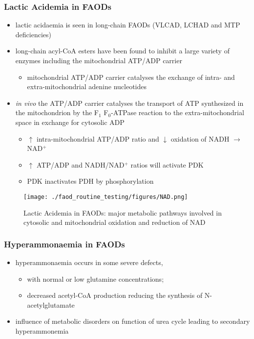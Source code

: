 \documentclass{scrartcl}
\begin{document}
\subsubsection{Lactic Acidemia in FAODs}
\label{sec:orga243ad2}
\begin{itemize}
\item lactic acidaemia is seen in long-chain FAODs (VLCAD, LCHAD and MTP deficiencies)
\item long-chain acyl-CoA esters have been found to inhibit a large
variety of enzymes including the mitochondrial ATP/ADP carrier
\begin{itemize}
\item mitochondrial ATP/ADP carrier catalyses the exchange of intra- and
extra-mitochondrial adenine nucleotides
\end{itemize}
\item \emph{in vivo} the ATP/ADP carrier catalyses the transport of ATP
synthesized in the mitochondrion by the F\(_{\text{1}}\) F\(_{\text{0}}\)-ATPase reaction to the
extra-mitochondrial space in exchange for cytosolic ADP
\begin{itemize}
\item \(\uparrow\) intra-mitochondrial ATP/ADP ratio and \(\downarrow\) oxidation of
NADH \(\to\) NAD\(^{\text{+}}\)
\item \(\uparrow\) ATP/ADP and NADH/NAD\(^{\text{+}}\) ratios will activate PDK
\item PDK inactivates PDH by phosphorylation
\end{itemize}
\end{itemize}

\begin{figure}[htbp]
\centering
\texttt{[image: ./faod\_routine\_testing/figures/NAD.png]}
\caption{\label{fig:orgd59ffe5}
Lactic Acidemia in FAODs: major metabolic pathways involved in cytosolic and mitochondrial oxidation and reduction of NAD}
\end{figure}


\subsubsection{Hyperammonaemia in FAODs}
\label{sec:orgb084500}
\begin{itemize}
\item hyperammonaemia occurs in some severe defects,
\begin{itemize}
\item with normal or low glutamine concentrations;
\item decreased acetyl-CoA production reducing the synthesis of N-acetylglutamate
\end{itemize}
\item influence of metabolic disorders on function of urea cycle leading
to secondary hyperammonemia
\end{itemize}
\end{document}
